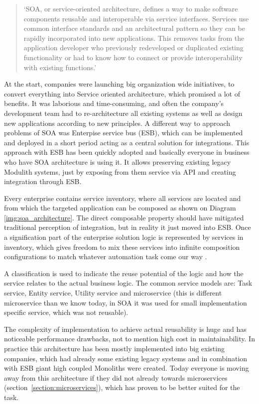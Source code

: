 \begin{quote}
    `SOA, or service-oriented architecture, defines a way to make software components reusable and interoperable via service interfaces. Services use common interface standards and an architectural pattern so they can be rapidly incorporated into new applications. This removes tasks from the application developer who previously redeveloped or duplicated existing functionality or had to know how to connect or provide interoperability with existing functions.' \cite{IBM_SOA}
\end{quote}

At the start, companies were launching big organization wide initiatives, to convert everything into Service oriented architecture, which promised a lot of benefits. It was laborious and time-consuming, and often the company's development team had to re-architecture all existing systems as well as design new applications according to new principles. A different way to approach problems of SOA was Enterpise service bus (ESB), which can be implemented and deployed in a short period acting as a central solution for integrations. This approach with ESB has been quickly adopted and basically everyone in business who have SOA architecture is using it. It allows preserving existing legacy Modulith systems, just by exposing from them service via API and creating integration through ESB.

Every enterprise contains service inventory, where all services are located and from which the targeted application can be composed as shown on Diagram \ref{img:soa_architecture}. The direct composable property should have mitigated traditional perception of integration, but in reality it just moved into ESB. Once a signification part of the enterprise solution logic is represented by services in inventory, which gives freedom to mix these services into infinite composition configurations to match whatever automation task come our way \cite{SERVICE_ORIENTED_ARCHITECTURE}.

A classification is used to indicate the reuse potential of the logic and how the service relates to the actual business logic. The common service models are: Task service, Entity service, Utility service and microservice (this is different microservice than we know today, in SOA it was used for small implementation specific service, which was not reusable). \cite{SERVICE_ORIENTED_ARCHITECTURE}

The complexity of implementation to achieve actual reusability is huge and has noticeable performance drawbacks, not to mention high cost in maintainability. In practice this architecture has been mostly implemented into big existing companies, which had already some existing legacy systems and in combination with ESB giant high coupled Monoliths were created. Today everyone is moving away from this architecture if they did not already towards microservices (section~\ref{section:microservices}), which has proven to be better suited for the task.

